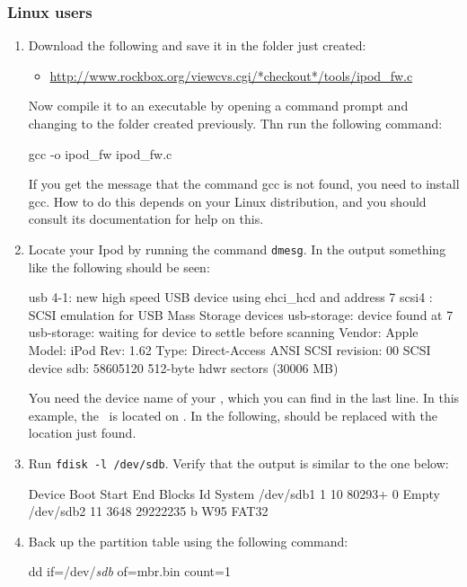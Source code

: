 \subsubsection{Linux users}
\begin{enumerate}
  \item Download the following and save it in the folder just
    created:
    \begin{itemize}
      \item \url{http://www.rockbox.org/viewcvs.cgi/*checkout*/tools/ipod_fw.c}
    \end{itemize}
    Now compile it to an executable by opening a command prompt and changing
    to the folder created previously. Thn run the following command:
    \begin{code}
    gcc -o ipod_fw ipod_fw.c
    \end{code}
    If you get the message that the command gcc is not found, you need to
    install gcc. How to do this depends on your Linux distribution, and
    you should consult its documentation for help on this.
  \item Locate your Ipod by running the command \verb|dmesg|. In the output
    something like the following should be seen:
\begin{code}
    usb 4-1: new high speed USB device using ehci_hcd and address 7
    scsi4 : SCSI emulation for USB Mass Storage devices
    usb-storage: device found at 7
    usb-storage: waiting for device to settle before scanning
      Vendor: Apple     Model: iPod              Rev: 1.62
      Type:   Direct-Access                      ANSI SCSI revision: 00
    SCSI device sdb: 58605120 512-byte hdwr sectors (30006 MB)
\end{code}
    You need the device name of your \dap, which you can find in the last line.
    In this example, the \dap\ is located on . In the following,
     should be replaced with the location just found.
  \item Run \verb|fdisk -l /dev/sdb|. Verify that the
    output is similar to the one below:
    \begin{code}
       Device Boot      Start         End      Blocks   Id  System
    /dev/sdb1               1          10       80293+   0  Empty
    /dev/sdb2              11        3648    29222235    b  W95 FAT32
    \end{code}
  \item Back up the partition table using the following command:
    \begin{code}
    dd if=/dev/\emph{sdb} of=mbr.bin count=1
    \end{code}


\end{enumerate}
